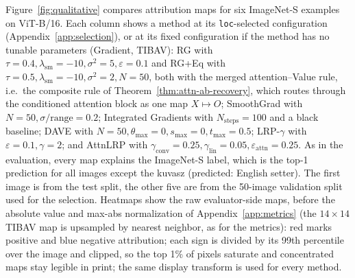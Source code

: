\documentclass[twoside]{article}
\newcommand{\1}{\mathbf{1}}
\begin{document}
Figure~\ref{fig:qualitative} compares attribution maps for six ImageNet-S examples on ViT-B/16.
Each column shows a method at its \texttt{loc}-selected configuration
(Appendix~\ref{app:selection}), or at its fixed configuration if the method has no tunable
parameters (Gradient, TIBAV): \ac{RG} with
$\tau{=}0.4,\lambda_{\mathrm{sm}}{=}{-}10,\sigma^2{=}5,\varepsilon{=}0.1$ and \ac{RG}+Eq with
$\tau{=}0.5,\lambda_{\mathrm{sm}}{=}{-}10,\sigma^2{=}2,N{=}50$, both with the merged
attention--Value rule, i.e.\ the composite rule of Theorem~\ref{thm:attn-ab-recovery}, which routes
through the conditioned attention block as one map $X \mapsto O$; SmoothGrad with
$N{=}50,\sigma/\mathrm{range}{=}0.2$; Integrated Gradients with $N_{\mathrm{steps}}{=}100$ and a
black baseline; DAVE with $N{=}50,\theta_{\max}{=}0,s_{\max}{=}0,t_{\max}{=}0.5$; LRP-$\gamma$ with
$\varepsilon{=}0.1,\gamma{=}2$; and AttnLRP with
$\gamma_{\mathrm{conv}}{=}0.25,\gamma_{\mathrm{lin}}{=}0.05,\varepsilon_{\mathrm{attn}}{=}0.25$. As
in the evaluation, every map explains the ImageNet-S label, which is the top-1 prediction for all
images except the kuvasz (predicted: English setter). The first image is from the test split, the
other five are from the 50-image validation split used for the selection. Heatmaps show the raw
evaluator-side maps, before the absolute value and max-abs normalization of
Appendix~\ref{app:metrics} (the $14{\times}14$ TIBAV map is upsampled by nearest neighbor, as for
the metrics): red marks positive and blue negative attribution; each sign is divided by its 99th
percentile over the image and clipped, so the top 1\% of pixels saturate and concentrated maps stay
legible in print; the same display transform is used for every method.
\end{document}
